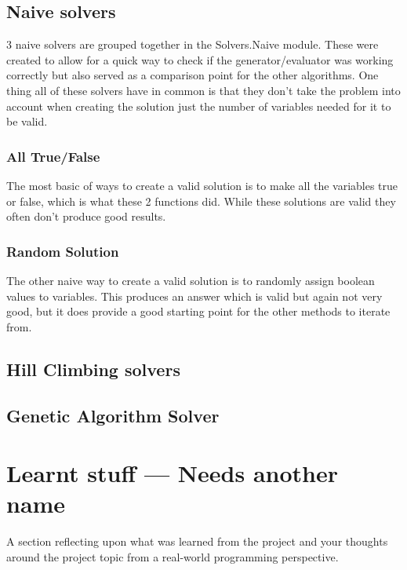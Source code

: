 \documentclass[a4paper]{article}
\begin{document}
\subsection{Naive solvers}
3 naive solvers are grouped together in the Solvers.Naive module.
These were created to allow for a quick way to check if the generator/evaluator was working correctly but also served as a comparison point for the other algorithms.
One thing all of these solvers have in common is that they don't take the problem into account when creating the solution just the number of variables needed for it to be valid.
\subsubsection{All True/False}
The most basic of ways to create a valid solution is to make all the variables true or false, which is what these 2 functions did.
While these solutions are valid they often don't produce good results.


\subsubsection{Random Solution}
The other naive way to create a valid solution is to randomly assign boolean values to variables.
This produces an answer which is valid but again not very good, but it does provide a good starting point for the other methods to iterate from.


\subsection{Hill Climbing solvers}
\subsection{Genetic Algorithm Solver}

\section{Learnt stuff --- Needs another name}
A section reflecting upon what was learned from the project and your
thoughts around the project topic from a real-world programming perspective.
\end{document}

